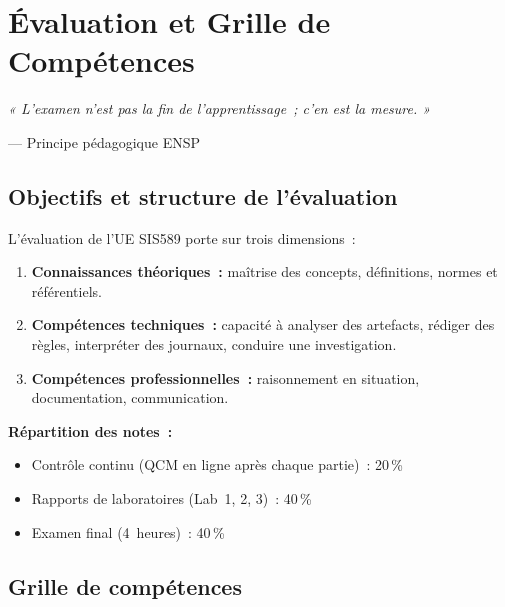 \chapter{Évaluation et Grille de Compétences}
\label{chap:evaluation}

\epigraph{\itshape « L'examen n'est pas la fin de l'apprentissage~;
  c'en est la mesure. »}
         {--- Principe pédagogique ENSP}

\section{Objectifs et structure de l'évaluation}
\label{sec:eval-structure}

L'évaluation de l'UE SIS589 porte sur trois dimensions~:

\begin{enumerate}
  \item \textbf{Connaissances théoriques~:} maîtrise des concepts,
        définitions, normes et référentiels.
  \item \textbf{Compétences techniques~:} capacité à analyser des
        artefacts, rédiger des règles, interpréter des journaux,
        conduire une investigation.
  \item \textbf{Compétences professionnelles~:} raisonnement en
        situation, documentation, communication.
\end{enumerate}

\textbf{Répartition des notes~:}
\begin{itemize}
  \item Contrôle continu (QCM en ligne après chaque partie)~: 20\,\%
  \item Rapports de laboratoires (Lab~1, 2, 3)~: 40\,\%
  \item Examen final (4~heures)~: 40\,\%
\end{itemize}

\section{Grille de compétences}
\label{sec:competences}

